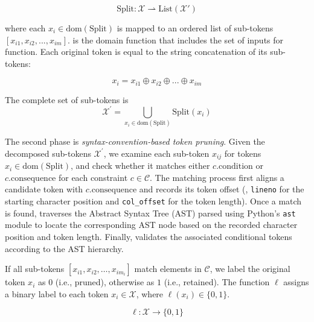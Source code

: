 \begin{equation}
\mathrm{Split} : \mathcal{X} \rightharpoonup \mathrm{List}(\mathcal{X}')
\end{equation}


where each $x_i \in \text{dom}(\mathrm{Split})$ is mapped to an ordered list of sub-tokens $[x_{i1},x_{i2}, ..., x_{im}]$.  is the domain function that includes the set of inputs for function. Each original token is equal to the string concatenation of its sub-tokens:

\begin{equation}
x_i = x_{i1}  \oplus x_{i2} \oplus ... \oplus x_{im}
\end{equation}

The complete set of sub-tokens is 
\begin{equation}
\mathcal{X}^{\prime} = \bigcup_{x_{i} \in \text{dom}(\mathrm{Split})} \mathrm{Split}(x_i)
\end{equation}


The second phase is \textit{syntax-convention-based token pruning}. Given the decomposed sub-tokens $\mathcal{X}^{\prime}$, we examine each sub-token $x_{ij}$ for tokens $x_i \in \text{dom}(\mathrm{Split})$, and check whether it matches either $c.\text{condition}$ or $c.\text{consequence}$ for each constraint $c \in \mathcal{C}$. The matching process first aligns a candidate token with $c.\text{consequence}$ and records its token offset (\ie, \texttt{lineno} for the starting character position and \texttt{col\_offset} for the token length). Once a match is found, \tool traverses the Abstract Syntax Tree (AST) parsed using Python's \texttt{ast} module to locate the corresponding AST node based on the recorded character position and token length. Finally, \tool validates the associated conditional tokens according to the AST hierarchy.

If all sub-tokens $[x_{i1}, x_{i2}, \dots, x_{im_i}]$ match elements in $\mathcal{C}$, we label the original token $x_i$ as $0$ (i.e., pruned), otherwise as $1$ (i.e., retained). The function $\ell$ assigns a binary label to each token $x_i \in \mathcal{X}$, where $\ell(x_i) \in \{0, 1\}$. 

\begin{equation}
\ell : \mathcal{X} \rightarrow \{0,1\}
\end{equation}




